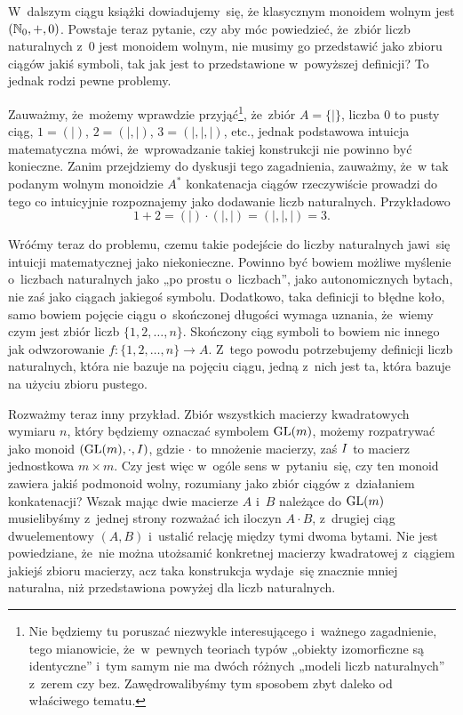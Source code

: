 \documentclass[a4paper,11pt]{article}
\begin{document}
W~dalszym ciągu książki dowiadujemy~się, że klasycznym monoidem wolnym
jest $( \mathbb{N}_{ 0 }, +, 0 )$. Powstaje teraz pytanie, czy aby móc
powiedzieć, że~zbiór liczb naturalnych z~$0$ jest monoidem wolnym, nie
musimy go przedstawić jako zbioru ciągów jakiś symboli, tak jak jest
to przedstawione w~powyższej definicji? To jednak rodzi pewne
problemy.

Zauważmy, że~możemy wprawdzie przyjąć\footnote{Nie będziemy tu
  poruszać niezwykle interesującego i~ważnego zagadnienie, tego
  mianowicie, że~w~pewnych teoriach typów „obiekty izomorficzne są
  identyczne” i~tym samym nie ma dwóch różnych „modeli liczb
  naturalnych” z~zerem czy bez. Zawędrowalibyśmy tym sposobem zbyt
  daleko od właściwego tematu.}, że~zbiór $A = \{ | \}$, liczba $0$ to
pusty ciąg, $1 = ( | )$, $2 = ( |, | )$, $3 = ( |, |, | )$, etc.,
jednak podstawowa intuicja matematyczna mówi, że~wprowadzanie takiej
konstrukcji nie powinno być konieczne. Zanim przejdziemy do dyskusji
tego zagadnienia, zauważmy, że~w tak podanym wolnym monoidzie
$A^{ * }$ konkatenacja ciągów rzeczywiście prowadzi do tego co
intuicyjnie rozpoznajemy jako dodawanie liczb naturalnych. Przykładowo
\begin{equation}
  \label{eq:Forys-Forys-04}
  1 + 2 = ( | ) \cdot ( |, | ) = ( |, |, | ) = 3.
\end{equation}

Wróćmy teraz do problemu, czemu takie podejście do liczby naturalnych
jawi~się intuicji matematycznej jako niekonieczne. Powinno być bowiem
możliwe myślenie o~liczbach naturalnych jako „po prostu o~liczbach”,
jako autonomicznych bytach, nie zaś jako ciągach jakiegoś symbolu.
Dodatkowo, taka definicji to błędne koło, samo bowiem pojęcie ciągu
o~skończonej długości wymaga uznania, że~wiemy czym jest zbiór liczb
$\{ 1, 2, \ldots, n \}$. Skończony ciąg symboli to bowiem nic innego jak
odwzorowanie $f : \{ 1, 2, \ldots, n \} \to A$. Z~tego powodu potrzebujemy
definicji liczb naturalnych, która nie bazuje na pojęciu ciągu, jedną
z~nich jest ta, która bazuje na użyciu zbioru pustego.

Rozważmy teraz inny przykład. Zbiór wszystkich macierzy kwadratowych
wymiaru $n$, który będziemy oznaczać symbolem $\mathrm{GL}( m )$, możemy
rozpatrywać jako monoid $( \mathrm{GL}( m ), \cdot, I )$, gdzie $\cdot$
to mnożenie macierzy, zaś $I$ to macierz jednostkowa
$m \times m$. Czy jest więc w~ogóle sens w~pytaniu~się, czy
ten monoid zawiera jakiś podmonoid wolny, rozumiany jako zbiór ciągów
z~działaniem konkatenacji? Wszak mając dwie macierze $A$ i~$B$
należące do $\mathrm{GL}( m )$ musielibyśmy z~jednej strony rozważać ich
iloczyn $A \cdot B$, z~drugiej ciąg dwuelementowy $( A, B )$ i~ustalić
relację między tymi dwoma bytami. Nie jest powiedziane, że~nie można
utożsamić konkretnej macierzy kwadratowej z~ciągiem jakiejś zbioru
macierzy, acz taka konstrukcja wydaje~się znacznie mniej naturalna,
niż przedstawiona powyżej dla liczb naturalnych.
\end{document}
